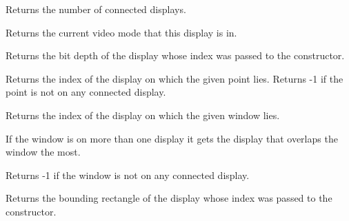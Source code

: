 \label{wxdisplaygetcount}


Returns the number of connected displays.


\label{wxdisplaygetcurrentmode}


Returns the current video mode that this display is in. 


\label{wxdisplaygetdepth}


Returns the bit depth of the display whose index was passed to the constructor.


\label{wxdisplaygetfrompoint}


Returns the index of the display on which the given point lies.  Returns -1 if
the point is not on any connected display.




\label{wxdisplaygetfromwindow}


Returns the index of the display on which the given window lies.

If the window is on more than one display it gets the display that overlaps the window the most.

Returns -1 if the window is not on any connected display.




\label{wxdisplaygetgeometry}


Returns the bounding rectangle of the display whose index was passed to the
constructor.


\label{wxdisplaygetmodes}



